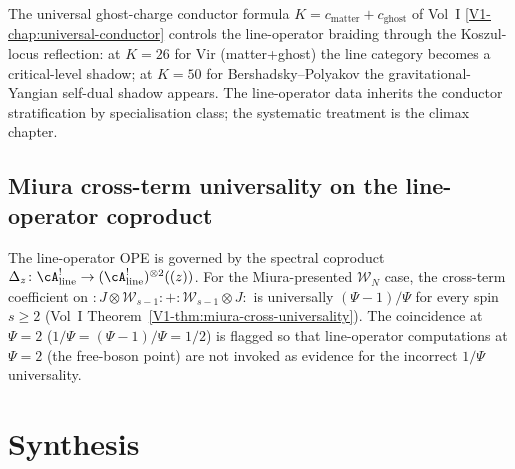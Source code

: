 \begin{remark}
\label{rem:line-operators-conductor-bridge}
The universal ghost-charge conductor formula
$K = c_{\mathrm{matter}} + c_{\mathrm{ghost}}$ of Vol~I
\cref{V1-chap:universal-conductor} controls the line-operator
braiding through the Koszul-locus reflection: at $K = 26$ for Vir
(matter+ghost) the line category becomes a critical-level shadow;
at $K = 50$ for Bershadsky--Polyakov the gravitational-Yangian
self-dual shadow appears. The line-operator data inherits the
conductor stratification by specialisation class; the systematic
treatment is the climax chapter.
\end{remark}

\subsection{Miura cross-term universality on the line-operator coproduct}
\label{subsec:line-operators-miura-coproduct}

\begin{remark}
\label{rem:line-operators-miura-coproduct}
The line-operator OPE is governed by the spectral coproduct
$\Delta_z\colon \cA^!_{\mathrm{line}}\to
(\cA^!_{\mathrm{line}})^{\otimes 2}((z))$. For the
Miura-presented $\mathcal{W}_N$ case, the cross-term coefficient on
$:J\otimes \mathcal{W}_{s-1}: + :\mathcal{W}_{s-1}\otimes J:$ is
universally $(\Psi-1)/\Psi$ for every spin $s\ge 2$ (Vol~I
Theorem~\ref*{V1-thm:miura-cross-universality}). The coincidence at
$\Psi=2$ ($1/\Psi = (\Psi-1)/\Psi = 1/2$) is flagged so that
line-operator computations at $\Psi=2$ (the free-boson point) are
not invoked as evidence for the incorrect $1/\Psi$ universality.
\end{remark}

\section{Synthesis}
\label{sec:line-operators-supplement}

